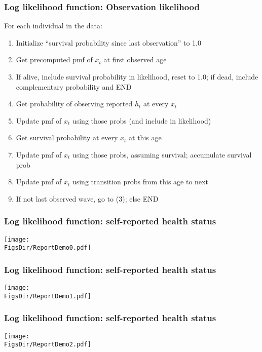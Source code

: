 \documentclass[aspectratio=169]{beamer}
\newcommand{\FigsDir}{../Figures}
\begin{document}
\begin{frame}\frametitle{Log likelihood function: Observation likelihood}
For each individual in the data:
\begin{enumerate}
	\item <1->Initialize ``survival probability since last observation'' to 1.0
	
	\item <1->Get precomputed pmf of $x_t$ at first observed age
	
	\item <5->If alive, include survival probability in likelihood, reset to 1.0; if dead, include complementary probability and END
	
	\item <2->Get probability of observing reported $h_t$ at every $x_t$
	
	\item <2->Update pmf of $x_t$ using those probs (and include in likelihood)
	
	\item <3->Get survival probability at every $x_t$ at this age
	
	\item <3->Update pmf of $x_t$ using those probs, assuming survival; accumulate survival prob
	
	\item <4->Update pmf of $x_t$ using transition probs from this age to next
	
	\item <4->If not last observed wave, go to (3); else END
\end{enumerate}
\end{frame}


\begin{frame}\frametitle{Log likelihood function: self-reported health status}
\begin{center}
	\texttt{[image: \\FigsDir/ReportDemo0.pdf]}
\end{center}
\end{frame}

\begin{frame}\frametitle{Log likelihood function: self-reported health status}
\begin{center}
\texttt{[image: \\FigsDir/ReportDemo1.pdf]}
\end{center}
\end{frame}

\begin{frame}\frametitle{Log likelihood function: self-reported health status}
\begin{center}
\texttt{[image: \\FigsDir/ReportDemo2.pdf]}
\end{center}
\end{frame}
\end{document}
